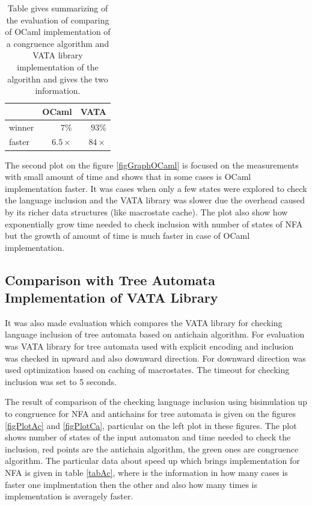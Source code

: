 \begin{center}
\begin{table}
\begin{center}
  \begin{tabular}{ | l | r | r |}
   \hline
    & \textbf{OCaml} & \textbf{VATA} \\ \hline \hline
    winner & $7\%$ & $93\%$ \\ \hline
    faster & $6.5\times$ & $84\times$ \\ \hline
   \end{tabular}
   \caption{Table gives summarizing of the evaluation of comparing of OCaml implementation of a congruence algorithm and VATA library implementation 
     of the algorithn and gives the two information.}
   \label{tabOcaml}
\end{center}
\end{table}
\end{center}

The second plot on the figure \ref{figGraphOCaml} is focused on the measurements with small amount of time and 
shows that in some cases is OCaml implementation faster. It was cases when only a few states were explored to 
check the language inclusion and the VATA library was slower due the overhead caused by its richer data structures (like macrostate cache). The plot also show
how exponentially grow time needed to check inclusion with number of states of NFA but 
the growth of amount of time is much faster in case of OCaml implementation.

\subsection{Comparison with Tree Automata Implementation of VATA Library}
It was also made evaluation which compares the VATA library for checking language inclusion of tree automata based on antichain algorithm. For evaluation was 
VATA library for tree automata used with explicit encoding and inclusion was checked in upward and also downward direction. For downward direction was used
optimization based on caching of macrostates. The timeout for checking inclusion was set to 5 seconds.

The result of comparison of the checking language inclusion using bisimulation up to congruence for NFA and antichains for tree automata 
is given on the figures \ref{figPlotAc} and \ref{figPlotCa}, particular on the left plot in these figures. The plot shows number of states of the input
automaton and time needed to check the inclusion, red points are the antichain algorithm, the green ones are congruence algorithm.
The particular data about speed up which brings implementation for NFA is given in table \ref{tabAc}, where is the information in how many cases is faster
one implmentation then the other and also how many times is implementation is averagely faster.

